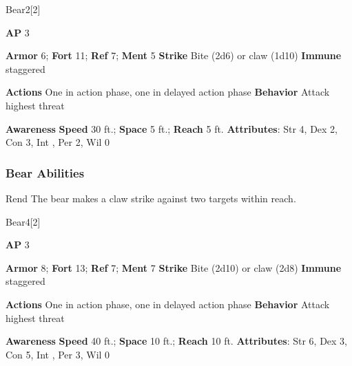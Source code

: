 \begin{monsection}[Black]{Bear}{2}[2]
\vspace{-1em}\vspace{-1em}
\begin{spellcontent}
\begin{spelltargetinginfo}
{\textbf{AP} 3}

\pari \textbf{Armor} 6;
\textbf{Fort} 11;
\textbf{Ref} 7;
\textbf{Ment} 5
\pari \textbf{Strike} Bite  (2d6) or claw  (1d10)
\pari \textbf{Immune} staggered

\pari \textbf{Actions} One in action phase, one in delayed action phase
\pari \textbf{Behavior} Attack highest threat
\end{spelltargetinginfo}
\end{spellcontent}

\begin{monsterfooter}
\pari \textbf{Awareness} 
\pari \textbf{Speed} 30 ft.;
\textbf{Space} 5 ft.;
\textbf{Reach} 5 ft.
\pari \textbf{Attributes}:
Str 4,
Dex 2,
Con 3,
Int ,
Per 2,
Wil 0
\end{monsterfooter}
\end{monsection}


\subsubsection{Bear Abilities}

\begin{ability}{Rend}
The bear makes a claw strike against two targets within reach.
\end{ability}






\begin{monsection}[Brown]{Bear}{4}[2]
\vspace{-1em}\vspace{-1em}
\begin{spellcontent}
\begin{spelltargetinginfo}
{\textbf{AP} 3}

\pari \textbf{Armor} 8;
\textbf{Fort} 13;
\textbf{Ref} 7;
\textbf{Ment} 7
\pari \textbf{Strike} Bite  (2d10) or claw  (2d8)
\pari \textbf{Immune} staggered

\pari \textbf{Actions} One in action phase, one in delayed action phase
\pari \textbf{Behavior} Attack highest threat
\end{spelltargetinginfo}
\end{spellcontent}

\begin{monsterfooter}
\pari \textbf{Awareness} 
\pari \textbf{Speed} 40 ft.;
\textbf{Space} 10 ft.;
\textbf{Reach} 10 ft.
\pari \textbf{Attributes}:
Str 6,
Dex 3,
Con 5,
Int ,
Per 3,
Wil 0
\end{monsterfooter}
\end{monsection}


